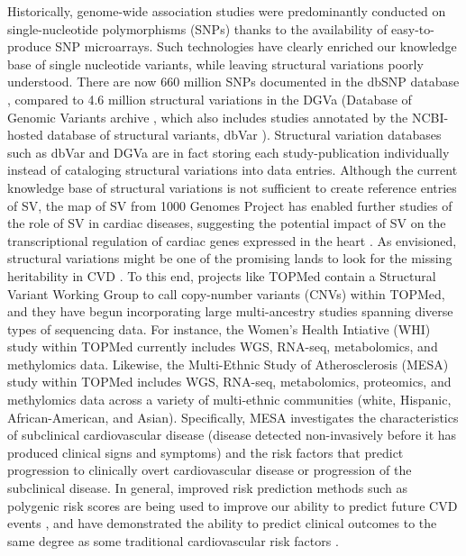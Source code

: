 \documentclass[letter]{bioinfo}
\begin{document}
	Historically, genome-wide association studies were predominantly conducted on single-nucleotide polymorphisms (SNPs) thanks to the availability of easy-to-produce SNP microarrays. Such technologies have clearly enriched our knowledge base of single nucleotide variants, while leaving structural variations poorly understood. There are now 660 million SNPs documented in the dbSNP database \citep{NCBI:2018:dbSNP}, compared to 4.6 million structural variations in the DGVa (Database of Genomic Variants archive \citep{EMBL-EBI:2018:Database}, which also includes studies annotated by the NCBI-hosted database of structural variants, dbVar \citep{NCBI:2018:dbVar}).  Structural variation databases such as dbVar and DGVa are in fact storing each study-publication individually instead of cataloging structural variations into data entries. Although the current knowledge base of structural variations is not sufficient to create reference entries of SV, the map of SV from 1000 Genomes Project \citep{Sudmant:2015:integrated} has enabled further studies of the role of SV in cardiac diseases, suggesting the potential impact of SV on the transcriptional regulation of cardiac genes expressed in the heart \citep{Haas:2018:Genomic}. As envisioned, structural variations might be one of the promising lands to look for the missing heritability in CVD \citep{Eichler:2010:Missing}.  To this end, projects like TOPMed contain a Structural Variant Working Group to call copy-number variants (CNVs) within TOPMed, and they have begun incorporating large multi-ancestry studies spanning diverse types of sequencing data.  For instance, the Women's Health Intiative (WHI) study \citep{NHLBI:1991:Women} within TOPMed currently includes WGS, RNA-seq, metabolomics, and methylomics data.  Likewise, the Multi-Ethnic Study of Atherosclerosis (MESA) study \citep{Bild:2002:MultiEthnic} within TOPMed includes WGS, RNA-seq, metabolomics, proteomics, and methylomics data across a variety of multi-ethnic communities (white, Hispanic, African-American, and Asian).  Specifically, MESA investigates the characteristics of subclinical cardiovascular disease (disease detected non-invasively before it has produced clinical signs and symptoms) and the risk factors that predict progression to clinically overt cardiovascular disease or progression of the subclinical disease.  In general, improved risk prediction methods such as polygenic risk scores are being used to improve our ability to predict future CVD events \citep{Goldstein:2014:Simple} , and have demonstrated the ability to predict clinical outcomes to the same degree as some traditional cardiovascular risk factors \citep{deVries:2015:Incremental}. 
	
\end{document}
